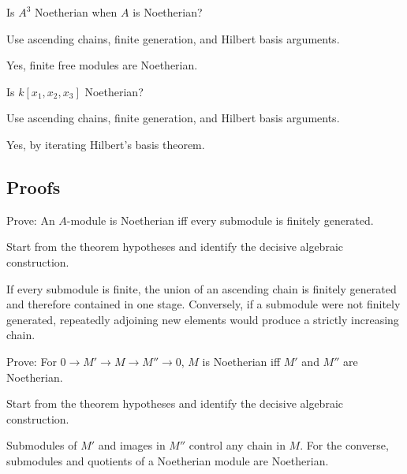 \begin{exercise}\label{exr:v15-expand-04}
Is $A^3$ Noetherian when $A$ is Noetherian?
\end{exercise}
\begin{hint}
Use ascending chains, finite generation, and Hilbert basis arguments.
\end{hint}
\begin{solution}
Yes, finite free modules are Noetherian.
\end{solution}

\begin{exercise}\label{exr:v15-expand-05}
Is $k[x_1,x_2,x_3]$ Noetherian?
\end{exercise}
\begin{hint}
Use ascending chains, finite generation, and Hilbert basis arguments.
\end{hint}
\begin{solution}
Yes, by iterating Hilbert's basis theorem.
\end{solution}

\subsection*{Proofs}

\begin{exercise}\label{exr:v15-expand-06}
Prove: An $A$-module is Noetherian iff every submodule is finitely generated.
\end{exercise}
\begin{hint}
Start from the theorem hypotheses and identify the decisive algebraic construction.
\end{hint}
\begin{solution}
If every submodule is finite, the union of an ascending chain is finitely generated and therefore contained in one stage. Conversely, if a submodule were not finitely generated, repeatedly adjoining new elements would produce a strictly increasing chain.
\end{solution}

\begin{exercise}\label{exr:v15-expand-07}
Prove: For $0\to M'\to M\to M''\to0$, $M$ is Noetherian iff $M'$ and $M''$ are Noetherian.
\end{exercise}
\begin{hint}
Start from the theorem hypotheses and identify the decisive algebraic construction.
\end{hint}
\begin{solution}
Submodules of $M'$ and images in $M''$ control any chain in $M$. For the converse, submodules and quotients of a Noetherian module are Noetherian.
\end{solution}

